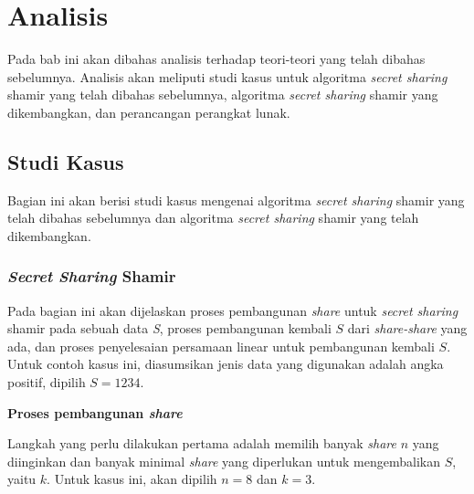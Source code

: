 \chapter{Analisis}
\label{chap:analisis}

Pada bab ini akan dibahas analisis terhadap teori-teori yang telah dibahas sebelumnya. Analisis akan meliputi studi kasus untuk algoritma \textit{secret sharing} shamir yang telah dibahas sebelumnya, algoritma \textit{secret sharing} shamir yang dikembangkan, dan perancangan perangkat lunak.

\section{Studi Kasus}
Bagian ini akan berisi studi kasus mengenai algoritma \textit{secret sharing} shamir yang telah dibahas sebelumnya dan algoritma \textit{secret sharing} shamir yang telah dikembangkan.

\subsection{\textit{Secret Sharing} Shamir}
Pada bagian ini akan dijelaskan proses pembangunan \textit{share} untuk \textit{secret sharing} shamir pada sebuah data \textit{S}, proses pembangunan kembali \begin{math}S\end{math} dari \textit{share-share} yang ada, dan proses penyelesaian persamaan linear untuk pembangunan kembali \begin{math}S\end{math}. Untuk contoh kasus ini, diasumsikan jenis data yang digunakan adalah angka positif, dipilih \begin{math}S=1234\end{math}.

\begin{flushleft}
	\textbf{Proses pembangunan \textit{share}}
\end{flushleft}

Langkah yang perlu dilakukan pertama adalah memilih banyak \textit{share} \begin{math}n\end{math} yang diinginkan dan banyak minimal \textit{share} yang diperlukan untuk mengembalikan \begin{math}S\end{math}, yaitu \begin{math}k\end{math}. Untuk kasus ini, akan dipilih \begin{math}n=8\end{math} dan \begin{math}k=3\end{math}.

